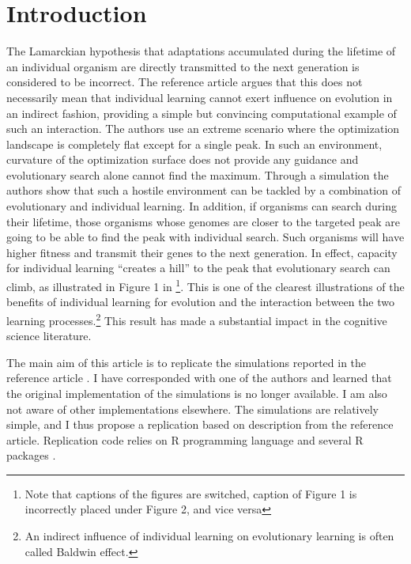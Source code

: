 \documentclass[10pt,a4paper,onecolumn]{article}
\begin{document}
\section{Introduction}\label{introduction}

The Lamarckian hypothesis that adaptations accumulated during the
lifetime of an individual organism are directly transmitted to the next
generation is considered to be incorrect. The reference article
\autocite{hinton1987learning} argues that this does not necessarily mean
that individual learning cannot exert influence on evolution in an
indirect fashion, providing a simple but convincing computational
example of such an interaction. The authors use an extreme scenario
where the optimization landscape is completely flat except for a single
peak. In such an environment, curvature of the optimization surface does
not provide any guidance and evolutionary search alone cannot find the
maximum. Through a simulation the authors show that such a hostile
environment can be tackled by a combination of evolutionary and
individual learning. In addition, if organisms can search during their
lifetime, those organisms whose genomes are closer to the targeted peak
are going to be able to find the peak with individual search. Such
organisms will have higher fitness and transmit their genes to the next
generation. In effect, capacity for individual learning ``creates a
hill'' to the peak that evolutionary search can climb, as illustrated in
Figure 1 in \textcite{hinton1987learning}\footnote{Note that captions of
  the figures are switched, caption of Figure 1 is incorrectly placed
  under Figure 2, and vice versa}. This is one of the clearest
illustrations of the benefits of individual learning for evolution and
the interaction between the two learning processes.\footnote{An indirect
  influence of individual learning on evolutionary learning is often
  called Baldwin effect.} This result has made a substantial impact in
the cognitive science literature.

The main aim of this article is to replicate the simulations reported in
the reference article \autocite{hinton1987learning}. I have corresponded
with one of the authors and learned that the original implementation of
the simulations is no longer available. I am also not aware of other
implementations elsewhere. The simulations are relatively simple, and I
thus propose a replication based on description from the reference
article. Replication code relies on R programming language \autocite{R}
and several R packages
\autocites{ggplot2}{dplyr}{reshape2}{doParallel}{foreach}{doRNG}{ggrepel}{directlabels}.
\end{document}
